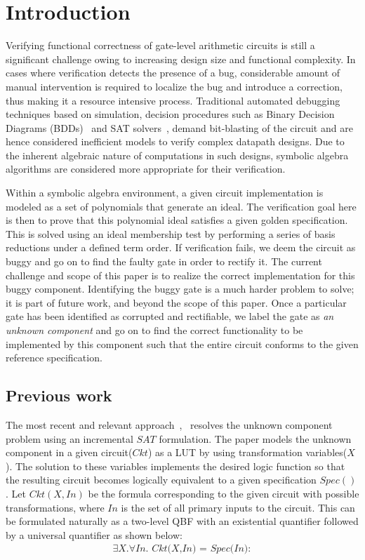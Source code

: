 \section{Introduction}
Verifying functional correctness of gate-level arithmetic circuits is
still a significant challenge owing to increasing design size and
functional complexity. In cases where verification detects the
presence of a bug, considerable amount of manual intervention is
required to localize the  bug and introduce a correction, thus making
it a resource intensive process. Traditional automated debugging
techniques based on simulation, decision procedures such as Binary
Decision Diagrams (BDDs)~\cite{bryant:1} and SAT
solvers~\cite{alanmi:2006}, demand bit-blasting of the circuit and are
hence considered inefficient models to verify complex datapath
designs. Due to the inherent algebraic nature of computations in such
designs, symbolic algebra algorithms are considered more appropriate
for their verification.  

Within a symbolic algebra environment, a given circuit implementation
is modeled as a set of polynomials that generate an ideal. The
verification goal here is then to prove that this polynomial ideal
satisfies a given golden specification. This is solved using an ideal
membership test by performing a series of \Grobner basis reductions
under a defined term order. If verification fails, we deem the circuit
as buggy and go on to find the faulty gate in order to rectify it. The
current challenge and scope of this paper is to realize the correct
implementation for this buggy component. Identifying the buggy gate is
a much harder problem to solve; it is part of future work, and beyond
the scope of this paper. Once a particular gate has been identified as
corrupted and rectifiable, we label the gate as {\it an unknown
  component} and go on to find the correct functionality to be
implemented by this component such that the entire circuit conforms to
the given reference specification.  
\subsection{Previous work}

The most recent and relevant approach~\cite{fujita:2015},~\cite{fujita:2012} resolves the unknown component problem using an incremental $SAT$ formulation. The paper models the unknown component in a given circuit($Ckt$) as a LUT by using transformation variables($X$). The solution to these variables implements the desired logic function so that the resulting circuit becomes logically equivalent to a given specification $Spec()$. Let $Ckt(X,In)$ be the formula corresponding to the given circuit with possible transformations, where $In$ is the set of all primary inputs to the circuit. This can be formulated naturally as a two-level QBF with an existential quantifier followed by a universal quantifier as shown below:
\vspace{0.1in}
\begin{align}
\exists \textit{X}.\forall \textit{In. Ckt(X,In) = Spec(In)}:    
\end{align}

